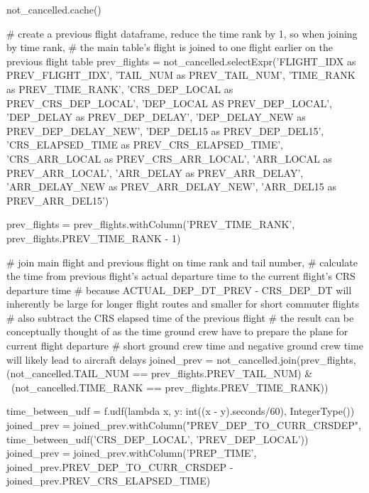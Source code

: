 \documentclass[11pt]{article}
\begin{document}
not_cancelled.cache()

# create a previous flight dataframe, reduce the time rank by 1, so when joining by time rank, 
# the main table's flight is joined to one flight earlier on the previous flight table
prev_flights = not_cancelled.selectExpr('FLIGHT_IDX as PREV_FLIGHT_IDX', 
                                        'TAIL_NUM as PREV_TAIL_NUM',
                                        'TIME_RANK as PREV_TIME_RANK', 
                                        'CRS_DEP_LOCAL as PREV_CRS_DEP_LOCAL', 
                                        'DEP_LOCAL AS PREV_DEP_LOCAL',
                                        'DEP_DELAY as PREV_DEP_DELAY', 
                                        'DEP_DELAY_NEW as PREV_DEP_DELAY_NEW', 
                                        'DEP_DEL15 as PREV_DEP_DEL15', 
                                        'CRS_ELAPSED_TIME as PREV_CRS_ELAPSED_TIME', 
                                        'CRS_ARR_LOCAL as PREV_CRS_ARR_LOCAL', 
                                        'ARR_LOCAL as PREV_ARR_LOCAL',
                                        'ARR_DELAY as PREV_ARR_DELAY', 
                                        'ARR_DELAY_NEW as PREV_ARR_DELAY_NEW', 
                                        'ARR_DEL15 as PREV_ARR_DEL15')

prev_flights = prev_flights.withColumn('PREV_TIME_RANK', prev_flights.PREV_TIME_RANK - 1)

# join main flight and previous flight on time rank and tail number,
# calculate the time from previous flight's actual departure time to the current flight's CRS departure time
# because ACTUAL_DEP_DT_PREV - CRS_DEP_DT will inherently be large for longer flight routes and smaller for short commuter flights
# also subtract the CRS elapsed time of the previous flight
# the result can be conceptually thought of as the time ground crew have to prepare the plane for current flight departure
# short ground crew time and negative ground crew time will likely lead to aircraft delays
joined_prev = not_cancelled.join(prev_flights, (not_cancelled.TAIL_NUM == prev_flights.PREV_TAIL_NUM) & \
                                 (not_cancelled.TIME_RANK == prev_flights.PREV_TIME_RANK))

time_between_udf =  f.udf(lambda x, y: int((x - y).seconds/60), IntegerType())                                
joined_prev = joined_prev.withColumn("PREV_DEP_TO_CURR_CRSDEP", time_between_udf('CRS_DEP_LOCAL', 'PREV_DEP_LOCAL'))
joined_prev = joined_prev.withColumn('PREP_TIME', joined_prev.PREV_DEP_TO_CURR_CRSDEP - joined_prev.PREV_CRS_ELAPSED_TIME)
\end{document}
